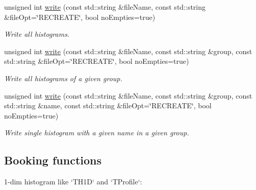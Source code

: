 \begin{CompactItemize}
\item 
\hypertarget{namespaceServices_1_1Histogramming_28e33620d16d7bfbd32267c113fbf874}{
unsigned int \hyperlink{namespaceServices_1_1Histogramming_28e33620d16d7bfbd32267c113fbf874}{write} (const std::string \&file\-Name, const std::string \&file\-Opt=\char`\"{}RECREATE\char`\"{}, bool no\-Empties=true)}
\label{namespaceServices_1_1Histogramming_28e33620d16d7bfbd32267c113fbf874}

\begin{CompactList}\small\item\em Write all histograms. \item\end{CompactList}\item 
\hypertarget{namespaceServices_1_1Histogramming_378c2752e7ff91e0e1f2469e4c9eb06c}{
unsigned int \hyperlink{namespaceServices_1_1Histogramming_378c2752e7ff91e0e1f2469e4c9eb06c}{write} (const std::string \&file\-Name, const std::string \&group, const std::string \&file\-Opt=\char`\"{}RECREATE\char`\"{}, bool no\-Empties=true)}
\label{namespaceServices_1_1Histogramming_378c2752e7ff91e0e1f2469e4c9eb06c}

\begin{CompactList}\small\item\em Write all histograms of a given group. \item\end{CompactList}\item 
\hypertarget{namespaceServices_1_1Histogramming_fc9ca7466afe5edb8c50a3e2068925c3}{
unsigned int \hyperlink{namespaceServices_1_1Histogramming_fc9ca7466afe5edb8c50a3e2068925c3}{write} (const std::string \&file\-Name, const std::string \&group, const std::string \&name, const std::string \&file\-Opt=\char`\"{}RECREATE\char`\"{}, bool no\-Empties=true)}
\label{namespaceServices_1_1Histogramming_fc9ca7466afe5edb8c50a3e2068925c3}

\begin{CompactList}\small\item\em Write single histogram with a given name in a given group. \item\end{CompactList}\end{CompactItemize}
\subsection*{Booking functions}
1-dim histogram like `TH1D` and `TProfile`:

